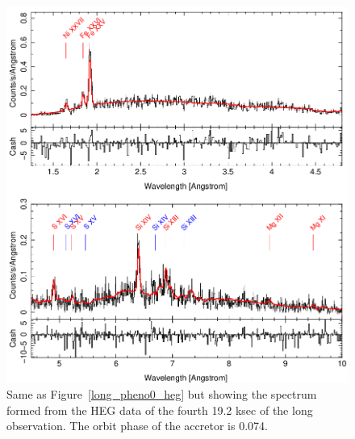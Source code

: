 \begin{figure}[t]
    \centering
        \includegraphics[width = \linewidth]{Chapters/Figures/long_pheno3_heg.png}
        \caption{Same as Figure~\ref{long_pheno0_heg} but showing the spectrum formed from the HEG data of the fourth 19.2 ksec of the long observation. The orbit phase of the accretor is 0.074.}
    \label{long_pheno3_heg}
\end{figure}


